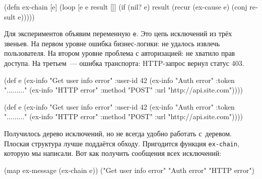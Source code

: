 \else

\begin{english}
  \begin{clojure}
(defn ex-chain [e]
  (loop [e e
         result []]
    (if (nil? e)
      result
      (recur (ex-cause e) (conj result e)))))
  \end{clojure}
\end{english}

\fi

Для экспериментов объявим переменную \verb|e|. Это цепь исключений из трёх
звеньев. На первом уровне ошибка бизнес-логики: не удалось извлечь
пользователя. На втором уровне проблема с авторизацией: не хватило прав
доступа. На третьем~--- ошибка транспорта: HTTP-запрос вернул статус 403.

\label{e-sample}

\ifx\devicetype\mobile

\begin{english}
  \begin{clojure}
(def e
  (ex-info
   "Get user info error"
   {:user-id 42}
   (ex-info
     "Auth error"
     {:token "........."}
     (ex-info
       "HTTP error"
       {:method "POST"
        :url "http://api.site.com"}))))
  \end{clojure}
\end{english}

\else

\begin{english}
  \begin{clojure}
(def e
  (ex-info
   "Get user info error"
   {:user-id 42}
   (ex-info "Auth error"
            {:token "........."}
            (ex-info "HTTP error"
                     {:method "POST"
                      :url "http://api.site.com"}))))
  \end{clojure}
\end{english}

\fi


Получилось дерево исключений, но не всегда удобно работать с~деревом. Плоская
структура лучше поддаётся обходу. Пригодится функция \verb|ex-chain|, которую
мы написали. Вот как получить сообщения всех исключений:

\ifx\devicetype\mobile

\begin{english}
  \begin{clojure}
(map ex-message (ex-chain e))
("Get user info error"
 "Auth error" "HTTP error")
  \end{clojure}
\end{english}

